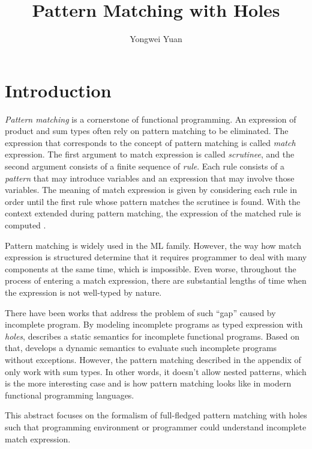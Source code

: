\documentclass[acmsmall,screen,review,nonacm]{acmart}
\begin{document}
  
\title{Pattern Matching with Holes}

\author{Yongwei Yuan}

\maketitle

\section{Introduction}
\emph{Pattern matching} is a cornerstone of functional programming. An expression of product and sum types often rely on pattern matching to be eliminated.
The expression that corresponds to the concept of pattern matching is called \emph{match} expression. The first argument to match expression is called \emph{scrutinee}, and the second argument consists of a finite sequence of \emph{rule}. Each rule consists of a \emph{pattern} that may introduce variables and an expression that may involve those variables. The meaning of match expression is given by considering each rule in order until the first rule whose pattern matches the scrutinee is found. With the context extended during pattern matching, the expression of the matched rule is computed \cite{Harper2012}.

Pattern matching is widely used in the ML family. However, the way how match expression is structured determine that it requires programmer to deal with many components at the same time, which is impossible. Even worse, throughout the process of entering a match expression, there are substantial lengths of time when the expression is not well-typed by nature.

There have been works that address the problem of such ``gap'' caused by incomplete program. By modeling incomplete programs as typed expression with \emph{holes}, \citet{DBLP:conf/popl/OmarVHAH17} describes a static semantics for incomplete functional programs. Based on that, \citet{DBLP:journals/pacmpl/OmarVCH19} develops a dynamic semantics to evaluate such incomplete programs without exceptions. However, the pattern matching described in the appendix of \citet{DBLP:journals/pacmpl/OmarVCH19} only work with sum types. In other words, it doesn't allow nested patterns, which is the more interesting case and is how pattern matching looks like in modern functional programming languages.

This abstract focuses on the formalism of full-fledged pattern matching with holes such that programming environment or programmer could understand incomplete match expression.
\end{document}
